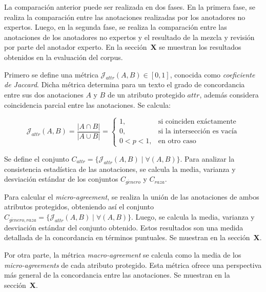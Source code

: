 La comparaci\'on anterior puede ser realizada en dos fases. En la primera fase, se realiza la comparaci\'on entre las anotaciones 
realizadas por los anotadores no expertos. Luego, en la segunda fase, se realiza la comparaci\'on entre las anotaciones de los 
anotadores no expertos y el resultado de la mezcla y revisi\'on por parte del anotador experto. En la secci\'on~\textbf{X} se 
muestran los resultados obtenidos en la evaluaci\'on del corpus.

Primero se define una m\'etrica $\mathcal{J}_{attr}(A, B) \in [0,1]$, conocida como \emph{coeficiente de Jaccard}. Dicha m\'etrica 
determina para un texto el grado de concordancia entre sus dos anotaciones $A$ y $B$ de un atributo protegido $attr$, adem\'as 
considera coincidencia parcial entre las anotaciones. Se calcula:

\begin{equation*}
    \mathcal{J}_{attr}(A, B) = \frac{|A \cap B|}{|A \cup B|} = \begin{cases}
        1, & \text{si coinciden ex\'actamente} \\
        0, & \text{si la intersecci\'on es vac\'ia} \\
        0 < p < 1, & \text{en otro caso}
    \end{cases}
\end{equation*}

Se define el conjunto $C_{attr} = \{\mathcal{J}_{attr}(A, B) \mid \forall (A, B)\}$. Para analizar la consistencia estad\'istica 
de las anotaciones, se calcula la media, varianza y desviaci\'on est\'andar de los conjuntos $C_{g\acute{e}nero}$ y $C_{raza}$.

Para calcular el \emph{micro-agreement}, se realiza la uni\'on de las anotaciones de ambos atributos protegidos, obteniendo as\'i
el conjunto $C_{g\acute{e}nero, raza} = \{\mathcal{J}_{attr}(A, B) \mid \forall (A, B)\}$. Luego, se calcula la media, varianza y
desviaci\'on est\'andar del conjunto obtenido. Estos resultados son una medida detallada de la concordancia en t\'erminos puntuales.
Se muestran en la secci\'on~\textbf{X}.

Por otra parte, la m\'etrica \emph{macro-agreement} se calcula como la media de los \emph{micro-agreements} de cada atributo protegido. 
Esta m\'etrica ofrece una perspectiva m\'as general de la concordancia entre las anotaciones. Se muestran en la secci\'on~\textbf{X}.

